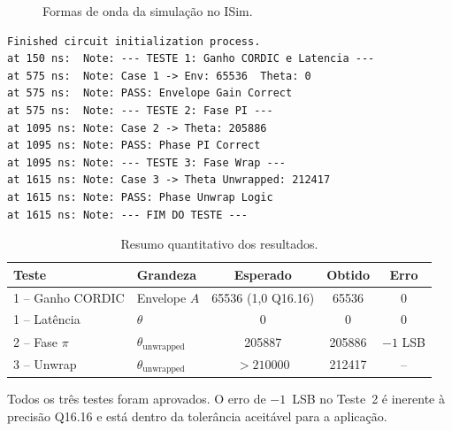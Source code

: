 \documentclass[a4paper,12pt]{article}
\begin{document}
\begin{figure}[H]
\centering
\caption{Formas de onda da simula\c{c}\~ao no ISim.}
\label{fig:waveform}
\end{figure}

\begin{lstlisting}[style=logstyle,
    caption={Log de sa\'ida do ISim -- todos os testes aprovados.},
    label={lst:log}]
Finished circuit initialization process.
at 150 ns:  Note: --- TESTE 1: Ganho CORDIC e Latencia ---
at 575 ns:  Note: Case 1 -> Env: 65536  Theta: 0
at 575 ns:  Note: PASS: Envelope Gain Correct
at 575 ns:  Note: --- TESTE 2: Fase PI ---
at 1095 ns: Note: Case 2 -> Theta: 205886
at 1095 ns: Note: PASS: Phase PI Correct
at 1095 ns: Note: --- TESTE 3: Fase Wrap ---
at 1615 ns: Note: Case 3 -> Theta Unwrapped: 212417
at 1615 ns: Note: PASS: Phase Unwrap Logic
at 1615 ns: Note: --- FIM DO TESTE ---
\end{lstlisting}

\begin{table}[H]
\centering
\caption{Resumo quantitativo dos resultados.}
\small
\begin{tabular}{llccc}
\hline
\textbf{Teste} & \textbf{Grandeza} & \textbf{Esperado} & \textbf{Obtido} & \textbf{Erro} \\
\hline
1 -- Ganho CORDIC & Envelope $A$              & 65536 (1,0 Q16.16) & 65536  & 0 \\
1 -- Lat\^encia   & $\theta$                  & 0                  & 0      & 0 \\
2 -- Fase $\pi$   & $\theta_{\text{unwrapped}}$ & 205887           & 205886 & $-1$ LSB \\
3 -- Unwrap       & $\theta_{\text{unwrapped}}$ & $>210000$        & 212417 & -- \\
\hline
\end{tabular}
\end{table}

Todos os tr\^es testes foram aprovados. O erro de $-1$~LSB no Teste~2 \'e inerente \`a precis\~ao Q16.16 e est\'a dentro da toler\^ancia aceit\'avel para a aplica\c{c}\~ao.
\end{document}

